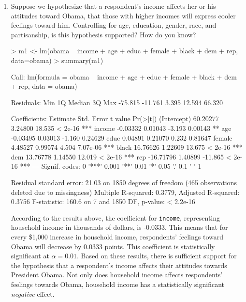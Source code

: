 \documentclass[12pt]{article}
\begin{document}
\begin{enumerate}
\item Suppose we hypothesize that a respondent's income affects her or his attitudes toward Obama, that those with higher incomes will express cooler feelings toward him.  Controlling for age, education, gender, race, and partisanship, is this hypothesis supported?  How do you know?

\begin{Schunk}
\begin{Sinput}
> m1 <- lm(obama ~ income + age + educ + female + black + dem + rep, data=obama)
> summary(m1)
\end{Sinput}
\begin{Soutput}
Call:
lm(formula = obama ~ income + age + educ + female + black + dem + 
    rep, data = obama)

Residuals:
    Min      1Q  Median      3Q     Max 
-75.815 -11.761   3.395  12.594  66.320 

Coefficients:
             Estimate Std. Error t value Pr(>|t|)    
(Intercept)  60.20277    3.24800  18.535  < 2e-16 ***
income       -0.03332    0.01043  -3.193  0.00143 ** 
age          -0.03495    0.03013  -1.160  0.24629    
educ          0.04891    0.21070   0.232  0.81647    
female        4.48527    0.99574   4.504 7.07e-06 ***
black        16.76626    1.22609  13.675  < 2e-16 ***
dem          13.76778    1.14550  12.019  < 2e-16 ***
rep         -16.71796    1.40899 -11.865  < 2e-16 ***
---
Signif. codes:  0 '***' 0.001 '**' 0.01 '*' 0.05 '.' 0.1 ' ' 1

Residual standard error: 21.03 on 1850 degrees of freedom
  (465 observations deleted due to missingness)
Multiple R-squared:  0.3779,	Adjusted R-squared:  0.3756 
F-statistic: 160.6 on 7 and 1850 DF,  p-value: < 2.2e-16
\end{Soutput}
\end{Schunk}

According to the results above, the coefficient for \texttt{income}, representing household income in thousands of dollars, is -0.0333. This means that for every \$1,000 increase in household income, respondents' feelings toward Obama will decrease by 0.0333 points. This coefficient is statistically significant at $\alpha=0.01$. Based on these results, there is sufficient support for the hypothesis that a respondent's income affects their attitudes towards President Obama. Not only does household income affects respondents' feelings towards Obama, household income has a statistically significant \emph{negative} effect.


\end{enumerate}
\end{document}
